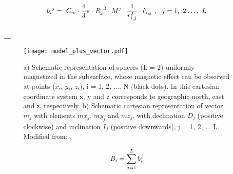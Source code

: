 \begin{singlespace}

\begin{equation} \label{eq:sphere2}
\centering
{b_i}^j=\ C_m \cdot \frac{4}{3}\pi \cdot {R_j}^3 \cdot {\bar{M}}^j\cdot\frac{1}{r_{i,j}^2}\cdot{\hat{r}}_{i,j}\ ,\ \ j=1,\ 2\ldots,\ L
\end{equation}

\begin{tabular}{ l }
\noindent{Where: $C_m=\ \frac{\mu_0}{4\pi}=\ {10}^{-7}\frac{\ H}{m}$; $R_j$ is the radius of the j-th sphere; $r_{i,j}$ is the distance}   \\ 
\noindent{(unit vector ${\hat{r}}_{i,j}$) between the center of the j-th sphere and the observation point i,}    \\  
\noindent{i = 1, 2, . .. N; and ${\bar{M}}^j=\left[{Mx}_j\ {My}_j\ {Mz}_j\right]^T$ is the vector formed by the cartesian} \\
\noindent{components of the magnetization of the j-th sphere (unit vector ${\hat{M}}^j)$.}
\end{tabular}

\bigskip

\begin{figure}[htbp]
\centering
\texttt{[image: model\_plus\_vector.pdf]}
\caption{a) Schematic representation of spheres (L = 2) uniformly magnetized in the subsurface, whose magnetic effect can be observed at points ($x_i$, $ y_i$, $z_i$), i = 1, 2, ..., N (black dots). In this cartesian coordinate system x, y and z corresponds to geographic north, east and z, respectively. b) Schematic cartesian representation of vector $m_j$ with elements $mx_j$, $my_j$ and $mz_j$, with declination $D_j$ (positive clockwise) and inclination $I_j$ (positive downwards), j = 1, 2, ... L. Modified from: \cite{OliveiraJr.2015}.}
\label{fig:model_plus_vector}
\end{figure}


\begin{equation} \label{eq:sphere3}
\centering
B_i=\sum_{j=1}^{L}b_i^j
\end{equation}



\end{singlespace}
